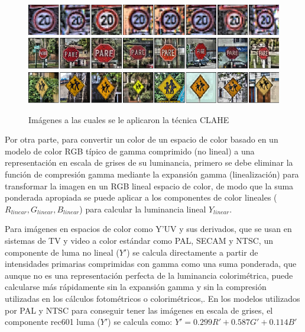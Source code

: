 			\begin{figure}[H]
			\includegraphics[width=1\textwidth]{images/desarrollo/Normalization_Processing/norm_test1}
			\includegraphics[width=1\textwidth]{images/desarrollo/Normalization_Processing/norm_test3}
			\includegraphics[width=1\textwidth]{images/desarrollo/Normalization_Processing/norm_test4}
			\begin{center}
			\caption{\small{Imágenes a las cuales se le aplicaron la técnica CLAHE }}
			
			{\small{\fontsize{10}{16.8}\selectfont {Fuente: Elaboración propia}}}
			\end{center}
			\vspace{-1.5em}
			\end{figure}
		
		Por otra parte, para convertir un color de un espacio de color basado en un modelo de color RGB típico de gamma comprimido (no lineal) a una representación en escala de grises de su luminancia, primero se debe eliminar la función de compresión gamma mediante la expansión gamma (linealización) para transformar la imagen en un RGB lineal espacio de color, de modo que la suma ponderada apropiada se puede aplicar a los componentes de color lineales ($R_{linear} , G_{linear} , B_{linear}$) para calcular la luminancia lineal $Y_{linear}$.

		Para imágenes en espacios de color como Y'UV y sus derivados, que se usan en sistemas de TV y video a color estándar como PAL, SECAM y NTSC, un componente de luma no lineal ($Y'$) se calcula directamente a partir de intensidades primarias comprimidas con gamma como una suma ponderada, que aunque no es una representación perfecta de la luminancia colorimétrica, puede calcularse más rápidamente sin la expansión gamma y sin la compresión utilizadas en los cálculos fotométricos o colorimétricos,\citep{POYNTON2003257}. En los modelos utilizados por PAL y NTSC para conseguir tener las imágenes en escala de grises, el componente rec601 luma ($Y'$) se calcula como: \begingroup\makeatletter\def\f@size{14.8}\check@mathfonts	$Y' = 0.299R' + 0.587G' +0.114B'$ \endgroup

